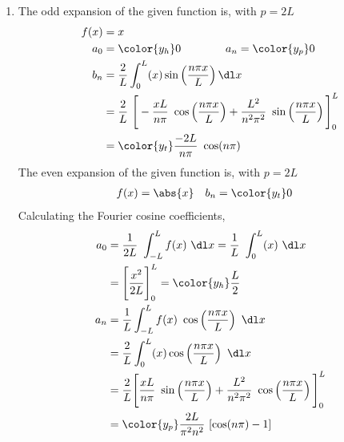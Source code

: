 \begin{enumerate}
    \item The odd expansion of the given function is, with $  p = 2L $
          \begin{align}
              f(x) & = x                                                 \\
              a_0  & = {\color{y_h} 0} \qquad\qquad
              a_n = {\color{y_p} 0}                                      \\
              b_n  & = \frac{2}{L} \int_{0}^{L} (x)\sin\left(
              \frac{n\pi x}{L} \right) \dl x                             \\
                   & =  \frac{2}{L}\ \Bigg[ -\frac{xL}{n\pi}\ \cos\left(
                  \frac{n\pi x}{L} \right)
                  + \frac{L^2}{n^2\pi^2}\ \sin\left( \frac{n\pi x}{L} \right)
              \Bigg]_{0}^{L}                                             \\
                   & = \color{y_t} \frac{-2L}{n\pi}\ \cos(n\pi)
          \end{align}
          The even expansion of the given function is, with $  p = 2L $
          \begin{align}
              f(x) & = \abs{x}       &
              b_n  & = \color{y_t} 0
          \end{align}
          Calculating the Fourier cosine coefficients,
          \begin{align}
              a_0 & = \frac{1}{2L}\ \int_{-L}^{L} f(x)\ \dl x
              = \frac{1}{L}\ \int_{0}^{L} (x)\ \dl x                              \\
                  & =  \Bigg[ \frac{x^2}{2L} \Bigg]_{0}^{L}
              = \color{y_h} \frac{L}{2}                                           \\
              a_n & = \frac{1}{L} \int_{-L}^{L} f(x)\ \cos\left( \frac{n\pi x}{L}
              \right)\ \dl x                                                      \\
                  & = \frac{2}{L} \int_{0}^{L} (x) \cos\left( \frac{n\pi x}{L}
              \right)\ \dl x                                                      \\
                  & = \frac{2}{L}\Bigg[ \frac{xL }{n\pi}\ \sin\left(
                  \frac{n\pi x}{L} \right)
                  + \frac{L^2}{n^2\pi^2}\ \cos\left( \frac{n\pi x}{L}
              \right)\Bigg]_{0}^{L}                                               \\
                  & = \color{y_p} \frac{2L}{\pi^2 n^2}\ [\cos(n\pi) - 1]
          \end{align}


\end{enumerate}

